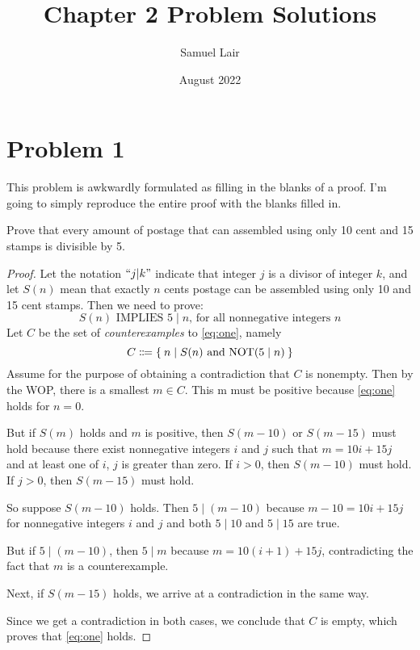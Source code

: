 \documentclass{article}
\title{Chapter 2 Problem Solutions}
\author{Samuel Lair}
\date{August 2022}
\begin{document}
\maketitle
\tableofcontents

\pagebreak

\section{Problem 1}
This problem is awkwardly formulated as filling in the blanks of a proof. I'm going to simply reproduce the entire proof with the blanks filled in.

Prove that every amount of postage that can assembled using only 10 cent and 15 stamps is divisible by 5.
\begin{proof}
	Let the notation $``j | k"$ indicate that integer $j$ is a divisor of integer $k$, and let $S(n)$ mean that exactly $n$ cents postage can be assembled using only 10 and 15 cent stamps. Then we need to prove:
	\begin{equation}\label{eq:one}
		S(n) \text{ IMPLIES } 5 \mid n \text{, for all nonnegative integers }n
	\end{equation}
	Let $C$ be the set of \textit{counterexamples} to \eqref{eq:one}, namely
	\[
		C \Coloneqq \Set{n | S(n) \text{ and NOT}(5 \mid n)}
	\]
	Assume for the purpose of obtaining a contradiction that $C$ is nonempty. Then by the WOP, there is a smallest $m \in C$. This m must be positive because \eqref{eq:one} holds for $n = 0$.

	But if $S(m)$ holds and $m$ is positive, then $S(m - 10)$ or $S(m-15)$ must hold because there exist nonnegative integers $i$ and $j$ such that $m = 10i + 15j$ and at least one of $i$, $j$ is greater than zero. If $i > 0$, then $S(m - 10)$ must hold. If $j > 0$, then $S(m - 15)$ must hold.

	So suppose $S(m - 10)$ holds. Then $5 \mid (m - 10)$ because $m - 10 = 10i + 15j$ for nonnegative integers $i$ and $j$ and both $5 \mid 10$ and $5 \mid 15$ are true.

	But if $5 \mid (m - 10)$, then $5 \mid m$ because $m = 10(i+1) + 15j$, contradicting the fact that $m$ is a counterexample.

	Next, if $S(m - 15)$ holds, we arrive at a contradiction in the same way.

	Since we get a contradiction in both cases, we conclude that $C$ is empty, which proves that \eqref{eq:one} holds.
\end{proof}
\end{document}
